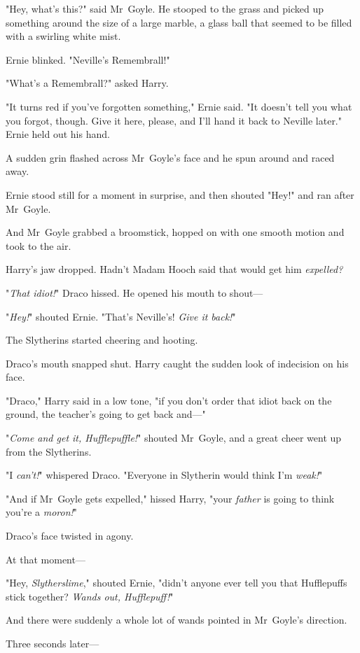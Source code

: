 "Hey, what’s this?" said Mr~Goyle. He stooped to the grass and picked up
something around the size of a large marble, a glass ball that seemed to be
filled with a swirling white mist.

Ernie blinked. "Neville’s Remembrall!"

"What’s a Remembrall?" asked Harry.

"It turns red if you’ve forgotten something," Ernie said. "It doesn’t tell you
what you forgot, though. Give it here, please, and I’ll hand it back to Neville
later." Ernie held out his hand.

A sudden grin flashed across Mr~Goyle’s face and he spun around and raced away.

Ernie stood still for a moment in surprise, and then shouted "Hey!" and ran
after Mr~Goyle.

And Mr~Goyle grabbed a broomstick, hopped on with one smooth motion and took
to the air.

Harry’s jaw dropped. Hadn’t Madam Hooch said that would get him \emph{expelled?}

"\emph{That idiot!}" Draco hissed. He opened his mouth to shout—

"\emph{Hey!}" shouted Ernie. "That’s Neville’s! \emph{Give it back!}"

The Slytherins started cheering and hooting.

Draco’s mouth snapped shut. Harry caught the sudden look of indecision on his
face.

"Draco," Harry said in a low tone, "if you don’t order that idiot back on the
ground, the teacher’s going to get back and—"

"\emph{Come and get it, Hufflepuffle!}" shouted Mr~Goyle, and a great cheer
went up from the Slytherins.

"I \emph{can’t!}" whispered Draco. "Everyone in Slytherin would think I’m
\emph{weak!}"

"And if Mr~Goyle gets expelled," hissed Harry, "your \emph{father} is going to
think you’re a \emph{moron!}"

Draco’s face twisted in agony.

At that moment—

"Hey, \emph{Slytherslime}," shouted Ernie, "didn’t anyone ever tell you that
Hufflepuffs stick together? \emph{Wands out, Hufflepuff!}"

And there were suddenly a whole lot of wands pointed in Mr~Goyle’s direction.

Three seconds later—

